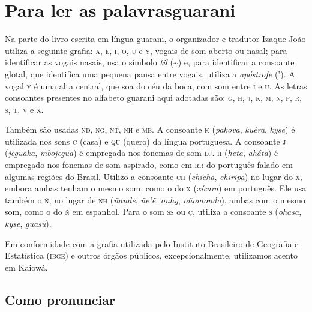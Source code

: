 \chapter[Para ler as palavras guarani]{Para ler as palavras\break guarani}

Na parte do livro escrita em língua guarani, o organizador e tradutor Izaque João utiliza a seguinte grafia: \textsc{a}, \textsc{e}, \textsc{i}, \textsc{o}, \textsc{u} e \textsc{y}, vogais de som aberto ou nasal; para identificar as vogais nasais, usa o símbolo \textit{til} (\textasciitilde{}) e, para identificar a consoante
glotal, que identifica uma pequena pausa entre vogais, utiliza a
\textit{apóstrofe} ('). A vogal \textsc{y} é uma alta central, que soa do céu da boca, com
som entre \textsc{i} e \textsc{u}. As letras consoantes presentes no alfabeto guarani aqui
adotadas são: \textsc{g}, \textsc{h}, \textsc{j}, \textsc{k}, \textsc{m}, \textsc{n}, \textsc{p}, \textsc{r}, \textsc{s}, \textsc{t}, \textsc{v} e \textsc{x}.

Também são usadas \textsc{nd}, \textsc{ng}, \textsc{nt}, \textsc{nh} e \textsc{mb}. A consoante \textsc{k} (\textit{pakova}, \textit{kuéra}, \textit{kyse}) é utilizada nos sons \textsc{c} (casa) e \textsc{qu} (quero) da língua portuguesa. A consoante \textsc{j} (\textit{jeguaka}, \textit{mbojegua}) é empregada nos fonemas de som \textsc{dj}. \textsc{h} (\textit{heta}, \textit{aháta}) é empregado nos
fonemas de som aspirado, como em \textsc{rr} do português falado em algumas
regiões do Brasil. Utilizo a consoante \textsc{ch} (\textit{chicha},
\textit{chiripa}) no lugar do \textsc{x}, embora ambas tenham o mesmo som, como o
do \textsc{x} (\textit{xícara}) em português. Ele usa também o \textsc{ñ}, no lugar de \textsc{nh} (\textit{ñande}, \textit{ñe'ẽ}, \textit{onhy}, \textit{oñomondo}), ambas com o mesmo som, como o do \textsc{ñ} em espanhol. Para o som \textsc{ss} ou \textsc{ç}, utiliza a consoante \textsc{s} (\textit{ohasa}, \textit{kyse}, \textit{guasu}).

Em conformidade com a grafia utilizada pelo Instituto Brasileiro de Geografia e Estatística (\textsc{ibge}) e outros órgãos públicos, excepcionalmente, utilizamos acento em Kaiowá.

\pagebreak
\section{Como pronunciar}

